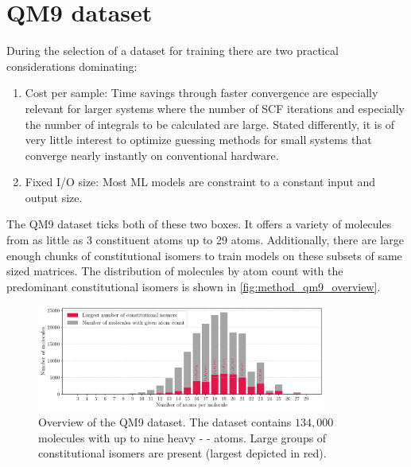 \section{QM9 dataset}
\label{sec:dataset}
During the selection of a dataset for training there are two practical considerations dominating:
\begin{enumerate}
    \item Cost per sample: Time savings through faster convergence are especially relevant for larger systems where the number of SCF iterations and especially the number of integrals to be calculated are large. Stated differently, it is of very little interest to optimize guessing methods for small systems that converge nearly instantly on conventional hardware. 
    \item Fixed I/O size: Most ML models are constraint to a constant input and output size. 
\end{enumerate}

The QM9 dataset \parencite{ref:data_qm9, ref:article1_qm9,ref:article2_qm9} ticks both of these two boxes. It offers a variety of molecules from as little as 3 constituent atoms up to 29 atoms. Additionally, there are large enough chunks of constitutional isomers to train models on these subsets of same sized matrices. The distribution of molecules by atom count with the predominant constitutional isomers is shown in \autoref{fig:method_qm9_overview}.
\begin{figure}[H]
    \centering
    \includegraphics[width=0.85\textwidth]{../fig/qm9_general/qm9_overview_stacked_bar.pdf}
    \caption[QM9 dataset overview]{Overview of the QM9 dataset. The dataset contains $134,000$ molecules with up to nine heavy -     - atoms. Large groups of constitutional isomers are present (largest depicted in red).}
    \label{fig:method_qm9_overview}
\end{figure}
